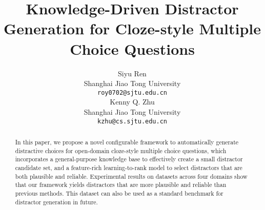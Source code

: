 \documentclass[11pt]{article}
\title{Knowledge-Driven Distractor Generation for Cloze-style Multiple Choice Questions}
\author{Siyu Ren\\
  Shanghai Jiao Tong University \\
  {\tt roy0702@sjtu.edu.cn} \\\And
  Kenny Q. Zhu\\
  Shanghai Jiao Tong University \\
  {\tt kzhu@cs.sjtu.edu.cn} \\}
\date{}
\begin{document}
\maketitle
\begin{abstract}
  In this paper, we propose a novel configurable framework to automatically generate distractive choices for open-domain cloze-style multiple choice questions, 
  which incorporates a general-purpose knowledge base to 
  effectively create a small distractor candidate set, and a feature-rich learning-to-rank model to select distractors that are both plausible and reliable. Experimental results on datasets across four domains show that our framework yields 
  distractors that are more plausible and reliable than
  previous methods. This dataset can also be used as a standard benchmark for 
  distractor generation in future.
\end{abstract}









\end{document}
